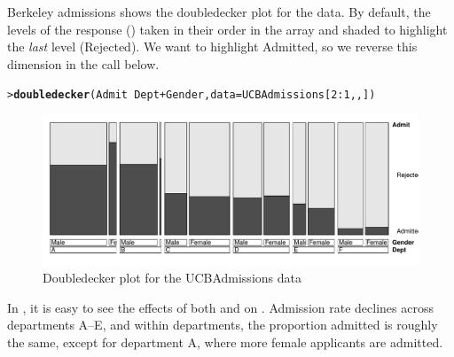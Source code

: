 \documentclass[10pt,krantz2]{krantz}\usepackage[]{graphicx}\usepackage[]{color}
\makeatletter
\newcommand{\hlnum}[1]{\textcolor[rgb]{0.686,0.059,0.569}{#1}}%
\newcommand{\hlopt}[1]{\textcolor[rgb]{0,0,0}{#1}}%
\newcommand{\hlstd}[1]{\textcolor[rgb]{0.345,0.345,0.345}{#1}}%
\newcommand{\hlkwc}[1]{\textcolor[rgb]{0.333,0.667,0.333}{#1}}%
\newcommand{\hlkwd}[1]{\textcolor[rgb]{0.737,0.353,0.396}{\textbf{#1}}}%
\newenvironment{kframe}{%
 \def\at@end@of@kframe{}%
 \ifinner\ifhmode%
  \def\at@end@of@kframe{\end{minipage}}%
  \begin{minipage}{\columnwidth}%
 \fi\fi%
 \def\FrameCommand##1{\hskip\@totalleftmargin \hskip-\fboxsep
 \colorbox{shadecolor}{##1}\hskip-\fboxsep
     \hskip-\linewidth \hskip-\@totalleftmargin \hskip\columnwidth}%
 \MakeFramed {\advance\hsize-\width
   \@totalleftmargin\z@ \linewidth\hsize
   \@setminipage}}%
 {\par\unskip\endMakeFramed%
 \at@end@of@kframe}
\newenvironment{knitrout}{}{} %
\renewenvironment{knitrout}{\small\renewcommand{\baselinestretch}{.85}}{} %
\makeatother
\begin{document}
\begin{Example}{Berkeley admissions}
 shows the doubledecker plot for the  data.
By default, the levels of the response () taken in their order in the array and
shaded to highlight the \emph{last} level (Rejected). We want to highlight Admitted, so we reverse
this dimension in the call below.
\begin{knitrout}
\color{fgcolor}\begin{kframe}
\begin{alltt}
\hlstd{> }\hlkwd{doubledecker}\hlstd{(Admit} \hlopt{~} \hlstd{Dept} \hlopt{+} \hlstd{Gender,} \hlkwc{data}\hlstd{=UCBAdmissions[}\hlnum{2}\hlopt{:}\hlnum{1}\hlstd{,,])}
\end{alltt}
\end{kframe}\begin{figure}[!htbp]

\centerline{\includegraphics[width=\textwidth]{ch05/fig/berkeley-doubledecker-1} }

\caption[Doubledecker plot for the UCBAdmissions data]{Doubledecker plot for the UCBAdmissions data\label{fig:berkeley-doubledecker}}
\end{figure}


\end{knitrout}
In , it is easy to see the effects of both  and  on 
. Admission rate declines across departments A--E, and within departments, the 
proportion admitted is roughly the same, except for department A, where more female applicants
are admitted.
\end{Example}
\end{document}
